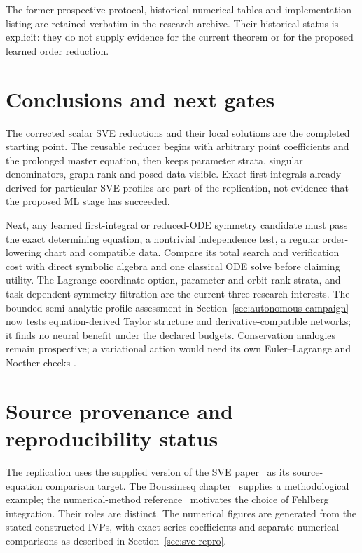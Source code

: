 \documentclass[11pt]{article}
\theoremstyle{definition}
\begin{document}
The former prospective protocol, historical numerical tables and
implementation listing are retained verbatim in the research archive.
Their historical status is explicit: they do not supply evidence for the
current theorem or for the proposed learned order reduction.



\section{Conclusions and next gates}
The corrected scalar SVE reductions and their local solutions are the
completed starting point. The reusable reducer begins with arbitrary point
coefficients and the prolonged master equation, then keeps parameter strata,
singular denominators, graph rank and posed data visible. Exact first
integrals already derived for particular SVE profiles are part of the
replication, not evidence that the proposed ML stage has succeeded.

Next, any learned first-integral or reduced-ODE symmetry candidate must pass
the exact determining equation, a nontrivial independence test, a regular
order-lowering chart and compatible data. Compare its total search and
verification cost with direct symbolic algebra and one classical ODE solve
before claiming utility. The Lagrange-coordinate option, parameter and
orbit-rank strata, and task-dependent symmetry filtration are the current
three research interests. The bounded semi-analytic profile assessment in
Section~\ref{sec:autonomous-campaign} now tests equation-derived Taylor
structure and derivative-compatible networks; it finds no neural benefit
under the declared budgets. Conservation analogies remain prospective;
a variational action would need its own Euler--Lagrange and
Noether checks \cite{noether}.

\section{Source provenance and reproducibility status}
The replication uses the supplied version of the SVE paper~\cite{ap}
as its source-equation comparison target. The Boussinesq
chapter~\cite{bruzon-gandarias-2021} supplies a methodological example;
the numerical-method reference~\cite{uddin2016rkf} motivates the choice
of Fehlberg integration. Their roles are distinct. The numerical figures
are generated from the stated constructed IVPs, with exact series
coefficients and separate numerical comparisons as described in
Section~\ref{sec:sve-repro}.
\end{document}
